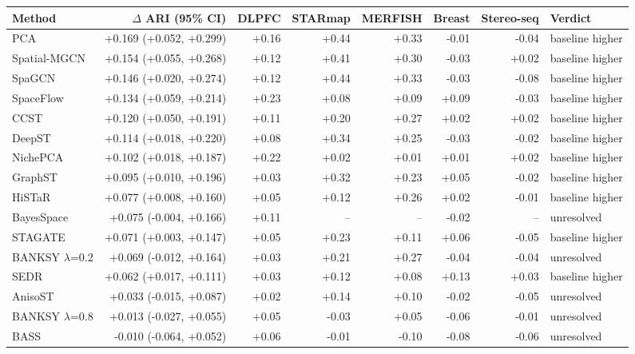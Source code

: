 \begin{tabular}{lrrrrrrl}
\toprule
Method & $\Delta$ ARI (95\% CI) & DLPFC & STARmap & MERFISH & Breast & Stereo-seq & Verdict \\
\midrule
PCA & +0.169 (+0.052, +0.299) & +0.16 & +0.44 & +0.33 & -0.01 & -0.04 & baseline higher \\
Spatial-MGCN & +0.154 (+0.055, +0.268) & +0.12 & +0.41 & +0.30 & -0.03 & +0.02 & baseline higher \\
SpaGCN & +0.146 (+0.020, +0.274) & +0.12 & +0.44 & +0.33 & -0.03 & -0.08 & baseline higher \\
SpaceFlow & +0.134 (+0.059, +0.214) & +0.23 & +0.08 & +0.09 & +0.09 & -0.03 & baseline higher \\
CCST & +0.120 (+0.050, +0.191) & +0.11 & +0.20 & +0.27 & +0.02 & +0.02 & baseline higher \\
DeepST & +0.114 (+0.018, +0.220) & +0.08 & +0.34 & +0.25 & -0.03 & -0.02 & baseline higher \\
NichePCA & +0.102 (+0.018, +0.187) & +0.22 & +0.02 & +0.01 & +0.01 & +0.02 & baseline higher \\
GraphST & +0.095 (+0.010, +0.196) & +0.03 & +0.32 & +0.23 & +0.05 & -0.02 & baseline higher \\
HiSTaR & +0.077 (+0.008, +0.160) & +0.05 & +0.12 & +0.26 & +0.02 & -0.01 & baseline higher \\
BayesSpace & +0.075 (-0.004, +0.166) & +0.11 & -- & -- & -0.02 & -- & unresolved \\
STAGATE & +0.071 (+0.003, +0.147) & +0.05 & +0.23 & +0.11 & +0.06 & -0.05 & baseline higher \\
BANKSY $\lambda$=0.2 & +0.069 (-0.012, +0.164) & +0.03 & +0.21 & +0.27 & -0.04 & -0.04 & unresolved \\
SEDR & +0.062 (+0.017, +0.111) & +0.03 & +0.12 & +0.08 & +0.13 & +0.03 & baseline higher \\
AnisoST & +0.033 (-0.015, +0.087) & +0.02 & +0.14 & +0.10 & -0.02 & -0.05 & unresolved \\
BANKSY $\lambda$=0.8 & +0.013 (-0.027, +0.055) & +0.05 & -0.03 & +0.05 & -0.06 & -0.01 & unresolved \\
BASS & -0.010 (-0.064, +0.052) & +0.06 & -0.01 & -0.10 & -0.08 & -0.06 & unresolved \\
\bottomrule
\end{tabular}
